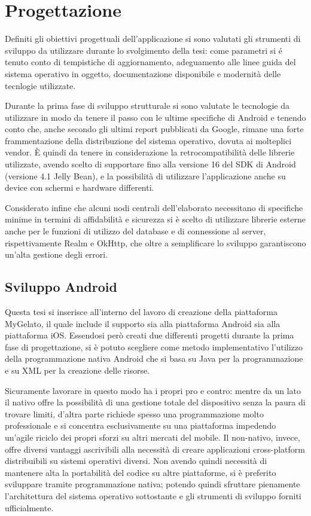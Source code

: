 
\chapter{Progettazione}

Definiti gli obiettivi progettuali dell'applicazione si sono valutati
gli strumenti di sviluppo da utilizzare durante lo svolgimento della
tesi: come parametri si é tenuto conto di tempistiche di aggiornamento,
adeguamento alle linee guida del sistema operativo in oggetto, documentazione
disponibile e modernità delle tecnlogie utilizzate.

Durante la prima fase di sviluppo strutturale si sono valutate le
tecnologie da utilizzare in modo da tenere il passo con le ultime
specifiche di Android e tenendo conto che, anche secondo gli ultimi
report pubblicati da Google, rimane una forte frammentazione della
distribuzione del sistema operativo, dovuta ai molteplici vendor.
\autocite{ANDROIDSTUDIO:DASHBOARD} È quindi da tenere in considerazione
la retrocompatibilità delle librerie utilizzate, avendo scelto di
supportare fino alla versione 16 del SDK di Android (versione 4.1
Jelly Bean), e la possibilità di utilizzare l'applicazione anche su
device con schermi e hardware differenti.

Considerato infine che alcuni nodi centrali dell'elaborato necessitano
di specifiche minime in termini di affidabilità e sicurezza si è scelto
di utilizzare librerie esterne anche per le funzioni di utilizzo del
database e di connessione al server, rispettivamente Realm e OkHttp,
che oltre a semplificare lo sviluppo garantiscono un'alta gestione
degli errori.

\section{Sviluppo Android}

Questa tesi si inserisce all'interno del lavoro di creazione della
piattaforma MyGelato, il quale include il supporto sia alla piattaforma
Android sia alla piattaforma iOS. Essendosi però creati due differenti
progetti durante la prima fase di progettazione, si è potuto scegliere
come metodo implementativo l'utilizzo della programmazione nativa
Android che si basa su Java per la programmazione e su XML per la
creazione delle risorse.

Sicuramente lavorare in questo modo ha i propri pro e contro: mentre
da un lato il nativo offre la possibilità di una gestione totale del
dispositivo senza la paura di trovare limiti, d’altra parte richiede
spesso una programmazione molto professionale e si concentra esclusivamente
su una piattaforma impedendo un’agile riciclo dei propri sforzi su
altri mercati del mobile. Il non-nativo, invece, offre diversi vantaggi
ascrivibili alla necessità di creare applicazioni cross-platform distribuibili
su sistemi operativi diversi.\autocite{HTMLIT:PROGNATIVA} Non avendo
quindi necessità di mantenere alta la portabilità del codice su altre
piattaforme, si è preferito sviluppare tramite programmazione nativa;
potendo quindi sfruttare pienamente l'architettura del sistema operativo
sottostante e gli strumenti di sviluppo forniti ufficialmente.

